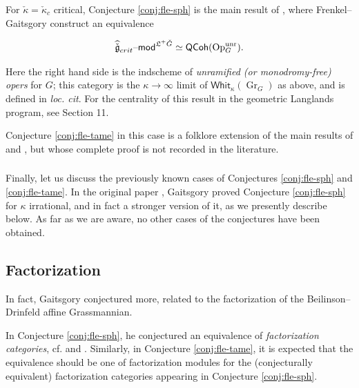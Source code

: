 \documentclass[11pt,reqno]{amsart}
\newcommand{\fL}{\mathfrak{L}}
\newcommand{\Gr}{\operatorname{Gr}}
\newcommand{\fg}{\mathfrak{g}}
\newcommand{\on}{\operatorname}
\theoremstyle{remark}
\numberwithin{equation}{section}
\renewcommand{\mod}{\text{\textendash}\mathsf{mod}}
\newcommand{\Whit}{\mathsf{Whit}}
\newcommand{\QCoh}{\mathsf{QCoh}}
\begin{document}
\subsubsection{}

For $\check{\kappa} = \check{\kappa}_c$ critical, 
Conjecture \ref{conj:fle-sph} 
is the main result of \cite{fg-sph}, where Frenkel--Gaitsgory construct an 
equivalence

\[
\widehat{\check{\fg}}_{crit}\mod^{\fL^+ \check{G}} \simeq 
\QCoh(\on{Op}_G^{\on{unr}}).
\]

\noindent Here the right hand side is the indscheme of
\emph{unramified (or monodromy-free) opers} for 
$G$; this category is the
$\kappa \to \infty$ limit of $\Whit_{\kappa}(\Gr_G)$ as 
above, and is defined in \emph{loc. cit}. For the centrality
of this result in the geometric Langlands program,
see \cite{dennis-laumonconf} Section 11.

Conjecture \ref{conj:fle-tame} in this case is a folklore
extension of the main results of \cite{dmod-aff-flag} and
\cite{fg-fusion}, but whose complete proof 
is not recorded in the literature.

\subsubsection{}


Finally, let us discuss the previously known cases of Conjectures 
\ref{conj:fle-sph} and \ref{conj:fle-tame}. In the original paper \cite{gtw}, 
Gaitsgory proved  Conjecture \ref{conj:fle-sph} for $\kappa$ irrational, and in 
fact a 
stronger version of it, as we presently describe below. As far as we are aware, 
no other cases of the conjectures have been obtained.  

\subsection{Factorization}

In fact, Gaitsgory conjectured more, related to the
factorization of the Beilinson--Drinfeld affine
Grassmannian.

In Conjecture \ref{conj:fle-sph}, he conjectured
an equivalence of \emph{factorization categories}, 
cf. \cite{gtw} and \cite{chiralcats}. 
Similarly, in Conjecture \ref{conj:fle-tame}, it is expected that
the equivalence should be one of factorization
modules for the (conjecturally equivalent) 
factorization categories appearing in 
Conjecture \ref{conj:fle-sph}. 
\end{document}
